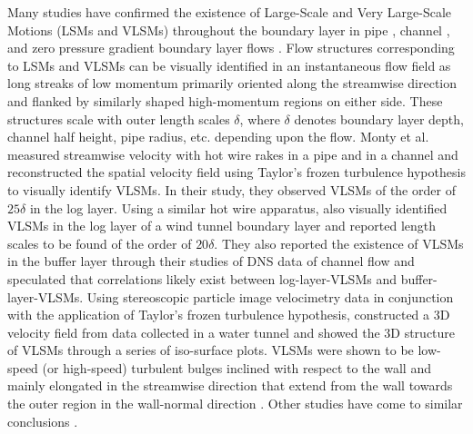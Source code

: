 Many studies have confirmed the existence of Large-Scale and Very Large-Scale Motions (LSMs and VLSMs) throughout the boundary layer in pipe \citep{monty_jfm_07,guala_adrian_jfm2006,baltzer_jfm_13}, channel \citep{monty_jfm_07,balakumar_adrian_ptrs_07,lee_sung_jfm_14,hutchins_marusic_jfm2007,fang2015blm}, and zero pressure gradient boundary layer flows \citep{balakumar_adrian_ptrs_07,Lee_sung_jfm11,hutchins_marusic_jfm2007}. Flow structures corresponding to LSMs and VLSMs can be visually identified in an instantaneous flow field as long streaks of low momentum primarily oriented along the streamwise direction and flanked by similarly shaped high-momentum regions on either side. These structures scale with outer length scales $\delta$, where $\delta$ denotes boundary layer depth, channel half height, pipe radius, etc. depending upon the flow. Monty et al. \citep{monty_jfm_07} measured streamwise velocity with hot wire rakes in a pipe and in a channel and reconstructed the spatial velocity field using Taylor's frozen turbulence hypothesis to visually identify VLSMs. In their study, they observed VLSMs of the order of $25\delta$ in the log layer. Using a similar hot wire apparatus, \citet{hutchins_marusic_jfm2007} also visually identified VLSMs in the log layer of a wind tunnel boundary layer and reported length scales to be found of the order of $20\delta$. They also reported the existence of VLSMs in the buffer layer through their studies of DNS data of channel flow and speculated that correlations likely exist between log-layer-VLSMs and buffer-layer-VLSMs. Using stereoscopic particle image velocimetry data in conjunction with the application of Taylor's frozen turbulence hypothesis, \citet{dennis_nickels_jfm2011} constructed a 3D velocity field from data collected in a water tunnel and showed the 3D structure of VLSMs through a series of iso-surface plots. VLSMs were shown to be low-speed (or high-speed) turbulent bulges inclined with respect to the wall and mainly elongated in the streamwise direction that extend from the wall towards the outer region in the wall-normal direction \citep{dennis_nickels_jfm2011}. Other studies have come to similar conclusions \citep{chung_jfm_10_large,kerherv_roux_etfs_2017}. 

